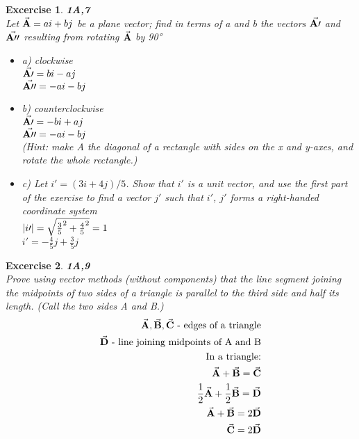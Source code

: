 \documentclass[11pt]{article}
\newtheorem{excercise}{Excercise}
\begin{document}
    \begin{excercise}
        \textbf{1A,7}\\
        Let $\va{A}=ai+bj$ be a plane vector; find in terms of a and b the vectors $\va{A\prime}$ and $\va{A\prime\prime}$ resulting from rotating $\va{A}$ by \ang{90}

        \begin{itemize}
            \item a) clockwise\\
            $\va{A\prime}=bi - aj$\\
            $\va{A\prime\prime}=-ai - bj$\\
            \item b) counterclockwise\\
            $\va{A\prime}=-bi + aj$\\
            $\va{A\prime\prime}=-ai - bj$\\
            (Hint: make A the diagonal of a rectangle with sides on the x and y-axes, and rotate the whole rectangle.)
            \item c) Let $i\prime = (3i +4j)/5$. Show that $i\prime$ is a unit vector, and use the first part of the exercise to find a vector $j\prime$ such that $i\prime$, $j'$ forms a right-handed coordinate system\\
            $\abs{i\prime}=\sqrt{\frac{3}{5}^2 + \frac{4}{5}^2}=1$\\
            $i'=-\frac{4}{5}j + \frac{3}{5}j$
        \end{itemize}
    \end{excercise}

    \begin{excercise}
        \textbf{1A,9}\\
        Prove using vector methods (without components) that the line segment joining the midpoints of two sides of a triangle is parallel to the third side and half its length. (Call the two sides A and B.)\\
        \begin{align}
            \va{A}, \va{B}, \va{C}\text{ - edges of a triangle}\\
            \va{D}\text{ - line joining midpoints of A and B}\\
            \text{ In a triangle:}\\
            \va{A} + \va{B} = \va{C}\\
            \frac{1}{2}\va{A} + \frac{1}{2}\va{B} = \va{D}\\
            \va{A} + \va{B} = 2\va{D}\\
            \va{C} = 2\va{D}
        \end{align}
    \end{excercise}
\end{document}
